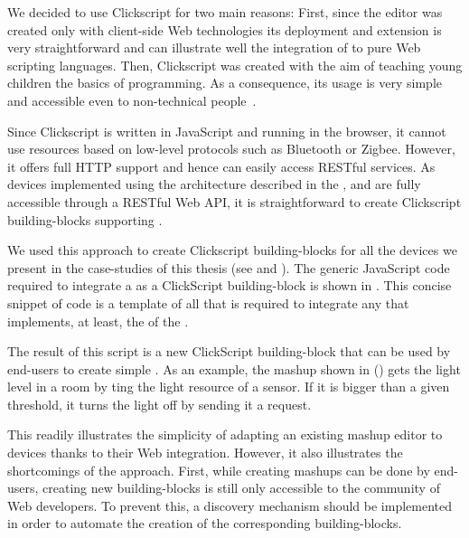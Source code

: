 We decided to use Clickscript for two main reasons: First, since the editor was created only with client-side Web technologies its deployment and extension is very straightforward and can illustrate well the integration of \sts{} to pure Web scripting languages. Then, Clickscript was created with the aim of teaching young children the basics of programming. As a consequence, its usage is very simple and accessible even to non-technical people~\cite{Naef2009}.

Since Clickscript is written in JavaScript and running in the browser, it cannot use resources based on low-level protocols such as Bluetooth or Zigbee. However, it offers full HTTP support and hence can easily access RESTful services. As \WoT{} devices implemented using the architecture described in the \devLayer{}, \findLayer{} and \shareLayer{} are fully accessible through a RESTful Web API, it is straightforward to create Clickscript building-blocks supporting \sts{}. 

We used this approach to create Clickscript building-blocks for all the devices we present in the case-studies of this thesis (see  and ). The generic JavaScript code required to integrate a \st{} as a ClickScript building-block is shown in . This concise snippet of code is a template of all that is required to integrate any \sts{} that implements, at least, the \devLayer{} of the \WoTA{}.

The result of this script is a new ClickScript building-block that can be used by end-users to create simple \pMashups{}. As an example, the mashup shown in  () gets the light level in a room by ting the light resource of a sensor. If it is bigger than a given threshold, it turns the light off by sending it a  request.




This readily illustrates the simplicity of adapting an existing mashup editor to \WoT{} devices thanks to their Web integration. However, it also illustrates the shortcomings of the approach. First, while creating mashups can be done by end-users, creating new building-blocks is still only accessible to the community of Web developers. To prevent this, a \sts{} discovery mechanism should be implemented in order to automate the creation of the corresponding building-blocks.

